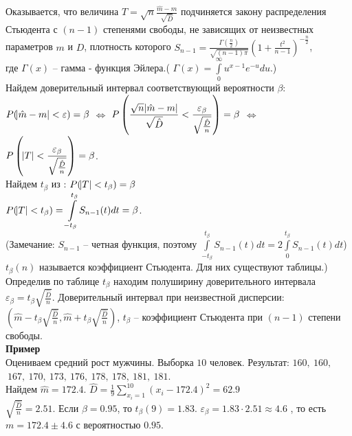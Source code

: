 \documentclass[russian, 12pt, fleqn]{article}
\begin{document}
Оказывается, что величина $T = \sqrt{n} \frac{\hat{m} - m}{\sqrt{\hat{D}}}$ подчиняется закону распределения Стьюдента с $(n-1)$ степенями свободы, не зависящих от неизвестных параметров $m$ и $D$, плотность которого $S_{n-1} = \frac{\Gamma(\frac{n}{2})}{\sqrt{(n-1)\pi}}(1 + \frac{t^2}{n - 1})^{-\frac{n}{2}}$, \\где $\Gamma (x)$ -- гамма - функция Эйлера.( $\Gamma (x) = \displaystyle{\int \limits_{0} ^ {\infty} } u^{x - 1} e ^{-u}du$.)\\
Найдем доверительный интервал соответствующий вероятности $\beta$: \\
$ P(\abs{\hat{m} - m} < \varepsilon) = \beta$ $\Leftrightarrow$ $\displaystyle { P\left (\frac{\sqrt{n} \abs{\hat{m} - m}}{\sqrt{\hat{D}}} < \frac{\varepsilon_\beta}{\sqrt{\frac{\hat{D}}{n}}}\right ) = \beta}$ $\Leftrightarrow$  $\displaystyle { P\left (\abs{T} < \frac{\varepsilon_\beta}{\sqrt{\frac{\hat{D}}{n}}} \right )}= \beta $.\\
Найдем  $t_\beta$ из : $P(\abs{T} < t_\beta) = \beta$\\
$P(\abs{T} < t_\beta) = \displaystyle{\int \limits_{-t_{\beta}}^{t_{\beta}}} S_{n-1}(t) dt = \beta$.\\
(Замечание: $S_{n-1}$ -- четная функция, поэтому  $\displaystyle{\int \limits_{-t_{\beta}}^{t_{\beta}}} S_{n-1}(t) dt =  2\displaystyle{\int \limits_{0}^{t_{\beta}}} S_{n-1}(t) dt$)\\
$t_\beta(n)$ называется коэффициент Стьюдента. Для них существуют таблицы.)\\
Определив по таблице $t_\beta$ находим полуширину доверительного интервала $\varepsilon_\beta = t_\beta \sqrt{\frac{\hat{D}}{n}}$. Доверительный интервал при неизвестной дисперсии: $(\hat{m} - t_\beta \sqrt{\frac{\hat{D}}{n}}, \hat{m} + t_\beta \sqrt{\frac{\hat{D}}{n}} )$, $t_\beta$  -- коэффициент Стьюдента при $(n-1)$ степени свободы.\\
\textbf{Пример}\\
Оцениваем средний рост мужчины. Выборка $10$ человек. Результат: $160,\ 160,$\\
 $\ 167,\ 170,\ 173,\ 176,\ 178,\ 178,\ 181,\ 181$.\\
Найдем $\hat{m} = 172.4$. $\hat{D} = \frac{1}{9} \displaystyle{\sum \limits _{x_i = 1}^{10}} (x_i - 172.4)^2 = 62.9$\\
$\sqrt{\frac{\hat{D}}{n}} = 2.51$. Если $\beta = 0.95$, то $t_\beta(9) = 1.83$. $\varepsilon_\beta = 1.83 \cdot 2.51 \approx 4.6$ , то есть $m=172.4 \pm 4.6$ с вероятностью $0.95$.\\
\end{document}
